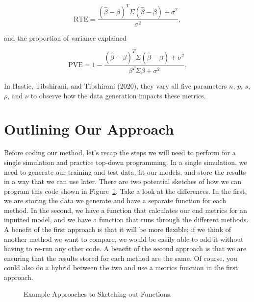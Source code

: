 \documentclass[
  letterpaper,
]{latex/krantz}
\begin{document}
\[\text{RTE} = \frac{(\hat{\beta}-\beta)^T \Sigma (\hat{\beta}-\beta)+\sigma^2}{\sigma^2}, \]

and the proportion of variance explained

\[\text{PVE} = 1 - \frac{(\hat{\beta}-\beta)^T \Sigma (\hat{\beta}-\beta)+\sigma^2}{\beta^T \Sigma \beta + \sigma^2}.\]

In Hastie, Tibshirani, and Tibshirani (2020), they vary all five
parameters \(n\), \(p\), \(s\), \(\rho\), and \(\nu\) to observe how the
data generation impacts these metrics.

\section{Outlining Our Approach}\label{outlining-our-approach}

Before coding our method, let's recap the steps we will need to perform
for a single simulation and practice top-down
programming. In a single simulation, we need
to generate our training and test data, fit our models, and store the
results in a way that we can use later. There are two potential sketches
of how we can program this code shown in Figure~\ref{fig-sketch}. Take a
look at the differences. In the first, we are storing the data we
generate and have a separate function for each method. In the second, we
have a function that calculates our end metrics for an inputted model,
and we have a function that runs through the different methods. A
benefit of the first approach is that it will be more flexible; if we
think of another method we want to compare, we would be easily able to
add it without having to re-run any other code. A benefit of the second
approach is that we are ensuring that the results stored for each method
are the same. Of course, you could also do a hybrid between the two and
use a metrics function in the first approach.

\begin{figure}


\caption{\label{fig-sketch}Example Approaches to Sketching out
Functions.}

\end{figure}%
\end{document}
